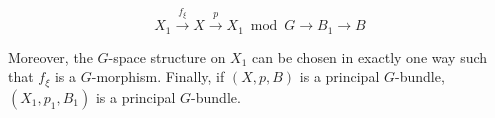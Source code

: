 $$X_1 \xrightarrow{f_\xi} X \xrightarrow{p} X_1 \bmod G \rightarrow B_1 \rightarrow B$$

Moreover, the $G$-space structure on $X_1$ can be chosen in exactly one way such that $f_\xi$ is a $G$-morphism. Finally, if $(X, p, B)$ is a principal $G$-bundle, $(X_1, p_1, B_1)$ is a principal $G$-bundle.
